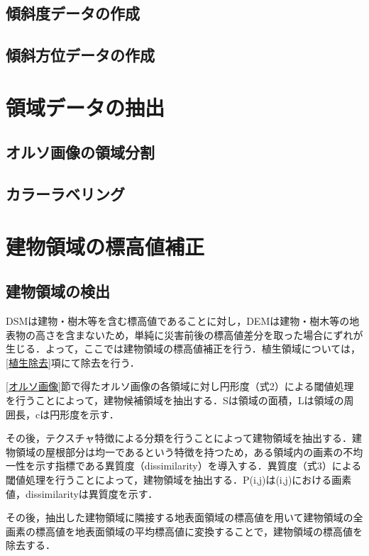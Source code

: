     \subsection{傾斜度データの作成}
    \subsection{傾斜方位データの作成}

  \section{領域データの抽出}
    \subsection{オルソ画像の領域分割}
    \subsection{カラーラベリング}



  \section{建物領域の標高値補正}
    \subsection{建物領域の検出}
    

      DSMは建物・樹木等を含む標高値であることに対し，DEMは建物・樹木等の地表物の高さを含まないため，単純に災害前後の標高値差分を取った場合にずれが生じる．よって，ここでは建物領域の標高値補正を行う．植生領域については，\ref{植生除去}項にて除去を行う．

      \ref{オルソ画像}節で得たオルソ画像の各領域に対し円形度（式2）による閾値処理を行うことによって，建物候補領域を抽出する．Sは領域の面積，Lは領域の周囲長，cは円形度を示す．
    
      その後，テクスチャ特徴による分類を行うことによって建物領域を抽出する．建物領域の屋根部分は均一であるという特徴を持つため，ある領域内の画素の不均一性を示す指標である異質度（dissimilarity）\cite{論文手法3}を導入する．異質度（式3）による閾値処理を行うことによって，建物領域を抽出する．P(i,j)は(i,j)における画素値，dissimilarityは異質度を示す．

      その後，抽出した建物領域に隣接する地表面領域の標高値を用いて建物領域の全画素の標高値を地表面領域の平均標高値に変換することで，建物領域の標高値を除去する．

